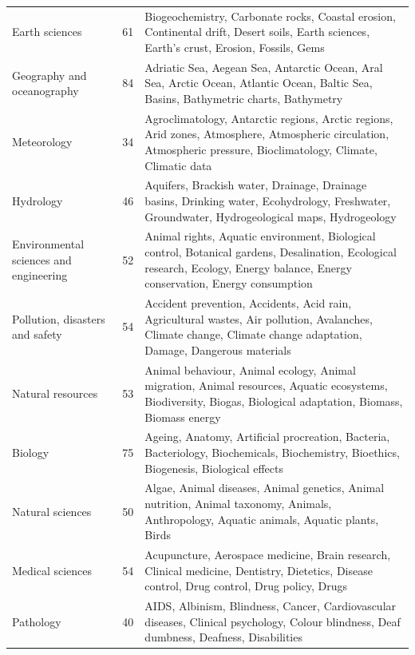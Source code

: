 \documentclass[11pt,a4paper]{article}
\begin{document}
{\begin{longtable}{p{3.5cm}P{2cm}p{9cm}}
		Earth sciences & 61 & Biogeochemistry, Carbonate rocks, Coastal erosion, Continental drift, Desert soils, Earth sciences, Earth's crust, Erosion, Fossils, Gems \\
		
		Geography and oceanography & 84 & Adriatic Sea, Aegean Sea, Antarctic Ocean, Aral Sea, Arctic Ocean, Atlantic Ocean, Baltic Sea, Basins, Bathymetric charts, Bathymetry \\
		
		Meteorology & 34 & Agroclimatology, Antarctic regions, Arctic regions, Arid zones, Atmosphere, Atmospheric circulation, Atmospheric pressure, Bioclimatology, Climate, Climatic data \\
		
		Hydrology & 46 & Aquifers, Brackish water, Drainage, Drainage basins, Drinking water, Ecohydrology, Freshwater, Groundwater, Hydrogeological maps, Hydrogeology \\
		
		Environmental sciences and engineering & 52 & Animal rights, Aquatic environment, Biological control, Botanical gardens, Desalination, Ecological research, Ecology, Energy balance, Energy conservation, Energy consumption \\
		
		Pollution, disasters and safety & 54 & Accident prevention, Accidents, Acid rain, Agricultural wastes, Air pollution, Avalanches, Climate change, Climate change adaptation, Damage, Dangerous materials \\
		
		Natural resources & 53 & Animal behaviour, Animal ecology, Animal migration, Animal resources, Aquatic ecosystems, Biodiversity, Biogas, Biological adaptation, Biomass, Biomass energy \\
		
		Biology & 75 & Ageing, Anatomy, Artificial procreation, Bacteria, Bacteriology, Biochemicals, Biochemistry, Bioethics, Biogenesis, Biological effects\\
		
		Natural sciences & 50 & Algae, Animal diseases, Animal genetics, Animal nutrition, Animal taxonomy, Animals, Anthropology, Aquatic animals, Aquatic plants, Birds \\
		
		Medical sciences & 54 & Acupuncture, Aerospace medicine, Brain research, Clinical medicine, Dentistry, Dietetics, Disease control, Drug control, Drug policy, Drugs \\
		
		Pathology & 40 & AIDS, Albinism, Blindness, Cancer, Cardiovascular diseases, Clinical psychology, Colour blindness, Deaf dumbness, Deafness, Disabilities \\
		
	\end{longtable}
}
\end{document}
